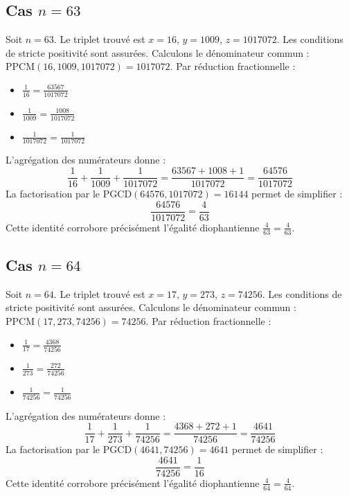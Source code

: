 \documentclass[11pt,a4paper]{article}
\begin{document}
\subsection{Cas $n = 63$}
Soit $n = 63$. Le triplet trouvé est $x = 16$, $y = 1009$, $z = 1017072$.
Les conditions de stricte positivité sont assurées.
Calculons le dénominateur commun : $\text{PPCM}(16, 1009, 1017072) = 1017072$.
Par réduction fractionnelle :
\begin{itemize}
    \item $\frac{1}{16} = \frac{63567}{1017072}$
    \item $\frac{1}{1009} = \frac{1008}{1017072}$
    \item $\frac{1}{1017072} = \frac{1}{1017072}$
\end{itemize}
L'agrégation des numérateurs donne :
$$ \frac{1}{16} + \frac{1}{1009} + \frac{1}{1017072} = \frac{63567 + 1008 + 1}{1017072} = \frac{64576}{1017072} $$
La factorisation par le $\text{PGCD}(64576, 1017072) = 16144$ permet de simplifier :
$$ \frac{64576}{1017072} = \frac{4}{63} $$
Cette identité corrobore précisément l'égalité diophantienne $\frac{4}{63} = \frac{4}{63}$.

\subsection{Cas $n = 64$}
Soit $n = 64$. Le triplet trouvé est $x = 17$, $y = 273$, $z = 74256$.
Les conditions de stricte positivité sont assurées.
Calculons le dénominateur commun : $\text{PPCM}(17, 273, 74256) = 74256$.
Par réduction fractionnelle :
\begin{itemize}
    \item $\frac{1}{17} = \frac{4368}{74256}$
    \item $\frac{1}{273} = \frac{272}{74256}$
    \item $\frac{1}{74256} = \frac{1}{74256}$
\end{itemize}
L'agrégation des numérateurs donne :
$$ \frac{1}{17} + \frac{1}{273} + \frac{1}{74256} = \frac{4368 + 272 + 1}{74256} = \frac{4641}{74256} $$
La factorisation par le $\text{PGCD}(4641, 74256) = 4641$ permet de simplifier :
$$ \frac{4641}{74256} = \frac{1}{16} $$
Cette identité corrobore précisément l'égalité diophantienne $\frac{4}{64} = \frac{4}{64}$.
\end{document}
